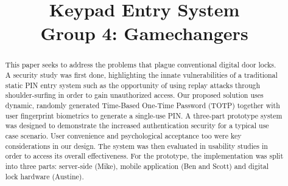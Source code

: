 \documentclass[conference]{IEEEtran}
\begin{document}
\title{Keypad Entry System\\
Group 4: Gamechangers
}

\author{
\and
{}
\and
{}
\and
{}
}

\maketitle

\begin{abstract}
This paper seeks to address the problems that plague conventional digital door locks. A security study was first done, highlighting the innate vulnerabilities of a traditional static PIN entry system such as the opportunity of using replay attacks through shoulder-surfing in order to gain unauthorized access. Our proposed solution uses dynamic, randomly generated Time-Based One-Time Password (TOTP) together with user fingerprint biometrics to generate a single-use PIN. A three-part prototype system was designed to demonstrate the increased authentication security for a typical use case scenario. User convenience and psychological acceptance too were key considerations in our design. The system was then evaluated in usability studies in order to access its overall effectiveness. For the prototype, the implementation was split into three parts: server-side (Mike), mobile application (Ben and Scott) and digital lock hardware (Austine).
\end{abstract}
\end{document}
